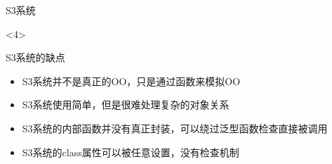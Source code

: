 \documentclass{beamerthemeMono}
\begin{document}
\begin{frame}[t,fragile]{\subsecname}{S3系统}
\begin{overlayarea}{\textwidth}{0.5\textheight}
\begin{onlyenv}<4>
\begin{badbox}{S3系统的缺点}
\begin{itemize}
\item[\PencilLeftDown] S3系统并不是真正的OO，只是通过函数来模拟OO
\item[\PencilLeftDown] S3系统使用简单，但是很难处理复杂的对象关系
\item[\PencilLeftDown] S3系统的内部函数并没有真正封装，可以绕过泛型函数检查直接被调用
\item[\PencilLeftDown] S3系统的class属性可以被任意设置，没有检查机制
\end{itemize}
\end{badbox}
\end{onlyenv}
\end{overlayarea}
\end{frame}
\end{document}
